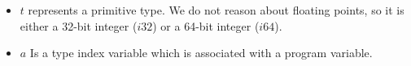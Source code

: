 \begin{itemize}
    \item $t$ represents a primitive \wasm type.
    We do not reason about floating points, so it is either a 32-bit integer ($i32$) or a 64-bit integer ($i64$).
    \item $a$ Is a type index variable which is associated with a program variable.
\end{itemize}


